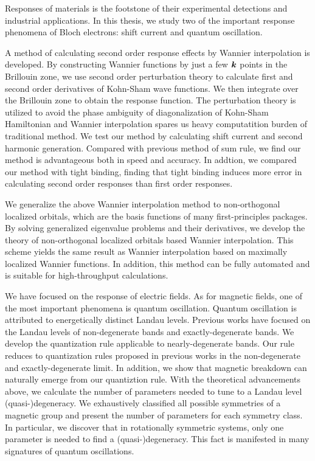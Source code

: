 \begin{eabstract}
  Responses of materials is the footstone of their experimental detections and industrial applications. In this thesis, we study two of the important response phenomena of Bloch electrons: shift current and quantum oscillation.

  A method of calculating second order response effects by Wannier interpolation is developed. By constructing Wannier functions by just a few $\boldsymbol{k}$ points in the Brillouin zone, we use second order perturbation theory to calculate first and second order derivatives of Kohn-Sham wave functions. We then integrate over the Brillouin zone to obtain the response function. The perturbation theory is utilized to avoid the phase ambiguity of diagonalization of Kohn-Sham Hamiltonian and Wannier interpolation spares us heavy computatition burden of traditional method. We test our method by calculating shift current and second harmonic generation. Compared with previous method of sum rule, we find our method is advantageous both in speed and accuracy. In addtion, we compared our method with tight binding, finding that tight binding induces more error in calculating second order responses than first order responses.

  We generalize the above Wannier interpolation method to non-orthogonal localized orbitals, which are the basis functions of many first-principles packages. By solving generalized eigenvalue problems and their derivatives, we develop the theory of non-orthogonal localized orbitals based Wannier interpolation. This scheme yields the same result as Wannier interpolation based on maximally localized Wannier functions. In addition, this method can be fully automated and is suitable for high-throughput calculations.

  We have focused on the response of electric fields. As for magnetic fields, one of the most important phenomena is quantum oscillation. Quantum oscillation is attributed to energetically distinct Landau levels. Previous works have focused on the Landau levels of non-degenerate bands and exactly-degenerate bands. We develop the quantization rule applicable to nearly-degenerate bands. Our rule reduces to quantization rules proposed in previous works in the non-degenerate and exactly-degenerate limit. In addition, we show that magnetic breakdown can naturally emerge from our quantiztion rule. With the theoretical advancements above, we calculate the number of parameters needed to tune to a Landau level (quasi-)degeneracy. We exhaustively classified all possible symmetries of a magnetic group and present the number of parameters for each symmetry class. In particular, we discover that in rotationally symmetric systems, only one parameter is needed to find a (quasi-)degeneracy. This fact is manifested in many signatures of quantum oscillations.
\end{eabstract}
